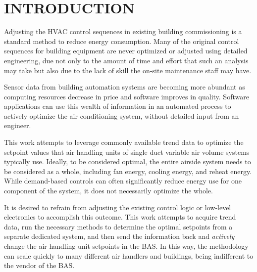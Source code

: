 %
%
%



\pagestyle{plain} %
\setcounter{page}{1}


\chapter{\texorpdfstring{\MakeUppercase{Introduction}}{Introduction}} 
Adjusting the HVAC control sequences in existing building commissioning
is a standard method to reduce energy consumption. Many of the original
control sequences for building equipment are never optimized or adjusted
using detailed engineering, due not only to the amount of time and
effort that such an analysis may take but also due to the lack of skill
the on-site maintenance staff may have. 

Sensor data from building automation systems are becoming more abundant
as computing resources decrease in price and software improves in
quality.  Software applications can use this wealth of information in an
automated process to actively optimize the air conditioning system,
without detailed input from an engineer. 

This work attempts to leverage commonly available trend data to optimize the
setpoint values that air handling units of single duct variable air volume
systems typically use. Ideally, to be considered optimal, the entire airside
system needs to be considered as a whole, including fan energy, cooling energy,
and reheat energy. While demand-based controls can often significantly reduce
energy use for one component of the system, it does not necessarily optimize
the whole. 

It is desired to refrain from adjusting the existing control logic or low-level
electronics to accomplish this outcome. This work attempts to acquire trend
data, run the necessary methods to determine the optimal setpoints from a
separate dedicated system, and then send the information back and
\textit{actively} change the air handling unit setpoints in the BAS. In this
way, the methodology can scale quickly to many different air handlers and
buildings, being indifferent to the vendor of the BAS.
